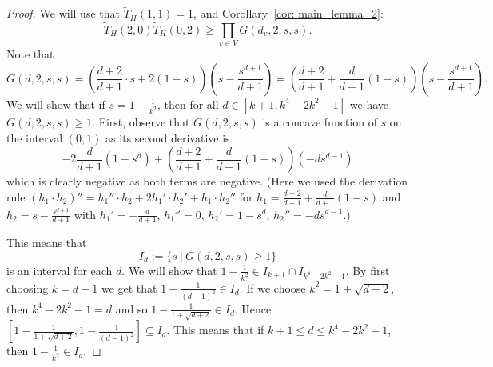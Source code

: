 \documentclass[12pt,a4paper]{amsart}
\numberwithin{equation}{section}
\theoremstyle{plain}
\theoremstyle{definition}
\newcommand{\1}{\textbf{1}}
\newcommand{\wT}{\widetilde{T}}
\begin{document}
\begin{proof}
We will use that $\wT_H(1,1)=1$, and Corollary~\ref{cor: main_lemma_2}:
$$\wT_H(2,0)\wT_H(0,2)\geqslant\prod_{v\in V}G(d_v,2,s,s).$$
Note that
$$G(d,2,s,s)=\left(\frac{d+2}{d+1}\cdot s+2(1-s)\right)\left(s-\frac{s^{d+1}}{d+1}\right)=\left(\frac{d+2}{d+1}+\frac{d}{d+1}(1-s)\right)\left(s-\frac{s^{d+1}}{d+1}\right).$$
We will show that if $s=1-\frac{1}{k^2}$, then for all $d\in [k+1,k^4-2k^2-1]$ we have $G(d,2,s,s)\geqslant1$. First, observe that $G(d,2,s,s)$ is a concave function of $s$ on 
the interval $(0,1)$ as its second derivative is
$$-2\frac{d}{d+1}(1-s^d)+\left(\frac{d+2}{d+1}+\frac{d}{d+1}(1-s)\right)(-ds^{d-1})$$
which is clearly negative as both terms are negative. (Here we used the derivation rule $(h_1\cdot h_2)''=h_1''\cdot h_2+2h_1'\cdot h_2'+h_1\cdot h_2''$ for $h_1=\frac{d+2}{d+1}+\frac{d}{d+1}(1-s)$ and $h_2=s-\frac{s^{d+1}}{d+1}$ with $h_1'=-\frac{d}{d+1}$, $h_1''=0$, $h_2'=1-s^d$, $h_2''=-ds^{d-1}$.)


This means that
$$I_d:=\{s\ |\ G(d,2,s,s)\geqslant1\}$$ 
is an interval for each $d$. We will show that $1-\frac{1}{k^2}\in I_{k+1}\cap I_{k^4-2k^2-1}$. By first choosing $k=d-1$ we get that $1-\frac{1}{(d-1)^2}\in I_d$. If we choose $k^2=1+\sqrt{d+2}$, then $k^4-2k^2-1=d$ and so $1-\frac{1}{1+\sqrt{d+2}}\in I_d$. Hence $\left[1-\frac{1}{1+\sqrt{d+2}},1-\frac{1}{(d-1)^2}\right]\subseteq I_d$. This means that if $k+1\leqslant   d\leqslant   k^4-2k^2-1$, then $1-\frac{1}{k^2}\in I_d$.


\end{proof}
\end{document}

